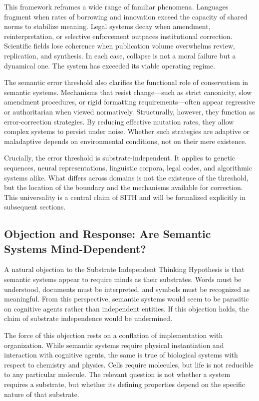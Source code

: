 \documentclass[11pt,oneside]{article}
\begin{document}
This framework reframes a wide range of familiar phenomena. Languages fragment when rates of borrowing and innovation exceed the capacity of shared norms to stabilize meaning. Legal systems decay when amendment, reinterpretation, or selective enforcement outpaces institutional correction. Scientific fields lose coherence when publication volume overwhelms review, replication, and synthesis. In each case, collapse is not a moral failure but a dynamical one. The system has exceeded its viable operating regime.

The semantic error threshold also clarifies the functional role of conservatism in semantic systems. Mechanisms that resist change—such as strict canonicity, slow amendment procedures, or rigid formatting requirements—often appear regressive or authoritarian when viewed normatively. Structurally, however, they function as error-correction strategies. By reducing effective mutation rates, they allow complex systems to persist under noise. Whether such strategies are adaptive or maladaptive depends on environmental conditions, not on their mere existence.

Crucially, the error threshold is substrate-independent. It applies to genetic sequences, neural representations, linguistic corpora, legal codes, and algorithmic systems alike. What differs across domains is not the existence of the threshold, but the location of the boundary and the mechanisms available for correction. This universality is a central claim of SITH and will be formalized explicitly in subsequent sections.

\subsection{Objection and Response: Are Semantic Systems Mind-Dependent?}

A natural objection to the Substrate Independent Thinking Hypothesis is that semantic systems appear to require minds as their substrates. Words must be understood, documents must be interpreted, and symbols must be recognized as meaningful. From this perspective, semantic systems would seem to be parasitic on cognitive agents rather than independent entities. If this objection holds, the claim of substrate independence would be undermined.

The force of this objection rests on a conflation of implementation with organization. While semantic systems require physical instantiation and interaction with cognitive agents, the same is true of biological systems with respect to chemistry and physics. Cells require molecules, but life is not reducible to any particular molecule. The relevant question is not whether a system requires a substrate, but whether its defining properties depend on the specific nature of that substrate.
\end{document}
